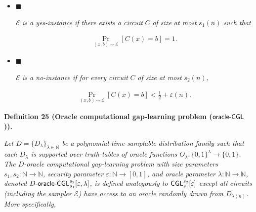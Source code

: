 \begin{itemize}


\item[] 
$\blacksquare$ 


$\mathcal{E}$\emph{ is a yes-instance if there exists a circuit }$C$\emph{ of size at most }$s_{1}(n)$\emph{ such that}\par


\[\begin{gathered}
\Pr_{(x,b)\sim\mathcal{E}}\left[C(x)=b\right]=1.
\end{gathered}\]





\item[] 
$\blacksquare$ 


$\mathcal{E}$\emph{ is a no-instance if for every circuit }$C$\emph{ of size at most }$s_{2}(n)$\emph{,}\par


\[\begin{gathered}
\Pr_{(x,b)\sim\mathcal{E}}\left[C(x)=b\right]<\frac{1}{2}+\varepsilon(n).
\end{gathered}\]





\end{itemize}







\par\medskip\noindent\textbf{
\textbf{Definition 25}\textbf{ }(Oracle computational gap-learning problem (${\sf oracle}\text{-}{\sf CGL}$))\textbf{.}
}\par



\emph{Let $D=\{D_{\lambda}\}_{\lambda\in\mathbb{N}}$ be a polynomial-time-samplable distribution family such that each $D_{\lambda}$ is supported over truth-tables of oracle functions $O_{\lambda}:\{0,1\}^{\lambda}\to\{0,1\}$. The $D$-oracle computational gap-learning problem with size parameters $s_{1},s_{2}:\mathbb{N}\to\mathbb{N}$, security parameter $\varepsilon:\mathbb{N}\to[0,1]$, and oracle parameter $\lambda:\mathbb{N}\to\mathbb{N}$, denoted $D\text{-}{\sf oracle}\text{-}{\sf CGL}_{s_{1}}^{s_{2}}[\varepsilon,\lambda]$, is defined analogously to ${\sf CGL}^{s_{2}}_{s_{1}}[\varepsilon]$ except all circuits (including the sampler $\mathcal{E}$) have access to an oracle randomly drawn from $D_{\lambda(n)}$. More specifically,}\par


